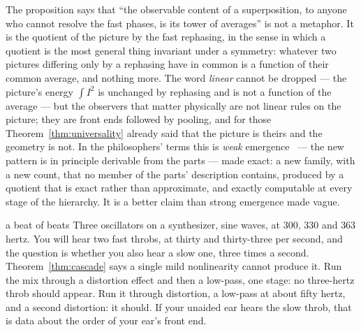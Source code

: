 The proposition says that ``the observable content of a superposition, to
anyone who cannot resolve the fast phases, is its tower of averages'' is
not a metaphor. It is the quotient of the picture by the fast rephasing,
in the sense in which a quotient is the most general thing invariant under
a symmetry: whatever two pictures differing only by a rephasing have in
common is a function of their common average, and nothing more. The word
\emph{linear} cannot be dropped --- the picture's energy $\int I^2$ is
unchanged by rephasing and is not a function of the average --- but the
observers that matter physically are not linear rules on the picture; they
are front ends followed by pooling, and for those
Theorem~\ref{thm:universality} already said that the picture is theirs and
the geometry is not. In the philosophers' terms this is \emph{weak}
emergence~\cite{Bedau1997Weak, Chalmers2006Emergence} --- the new pattern
is in principle derivable from the parts --- made exact: a new family, with
a new count, that no member of the parts' description contains, produced
by a quotient that is exact rather than approximate, and exactly computable
at every stage of the hierarchy. It is a better claim than strong
emergence made vague.

\begin{tryit}{a beat of beats}
Three oscillators on a synthesizer, sine waves, at $300$, $330$ and $363$
hertz. You will hear two fast throbs, at thirty and thirty-three per
second, and the question is whether you also hear a slow one, three times a
second. Theorem~\ref{thm:cascade} says a single mild nonlinearity cannot
produce it. Run the mix through a distortion effect and then a low-pass,
one stage: no three-hertz throb should appear. Run it through distortion,
a low-pass at about fifty hertz, and a second distortion: it should. If
your unaided ear hears the slow throb, that is data about the order of your
ear's front end.
\end{tryit}
